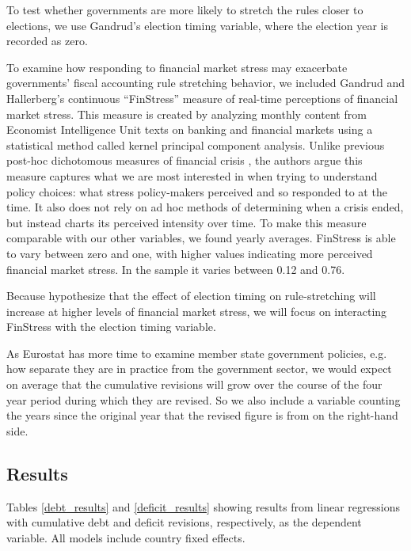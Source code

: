 \documentclass[]{article}
\begin{document}
To test whether governments are more likely to stretch the rules closer to elections, we use Gandrud's \citeyearpar{gandrudYrcurnt} election timing variable, where the election year is recorded as zero.

To examine how responding to financial market stress may exacerbate governments' fiscal accounting rule stretching behavior, we included Gandrud and Hallerberg's \citeyearpar{finstress_paper} continuous ``FinStress'' measure of real-time perceptions of financial market stress. This measure is created by analyzing monthly content from Economist Intelligence Unit texts on banking and financial markets using a statistical method called kernel principal component analysis. Unlike previous post-hoc dichotomous measures of financial crisis \citep[e.g. measures compiled by][]{Laeven2012,ReinhartRog2010}, the authors argue this measure captures what we are most interested in when trying to understand policy choices: what stress policy-makers perceived and so responded to at the time. It also does not rely on ad hoc methods of determining when a crisis ended, but instead charts its perceived intensity over time. To make this measure comparable with our other variables, we found yearly averages. FinStress is able to vary between zero and one, with higher values indicating more perceived financial market stress. In the sample it varies between 0.12 and 0.76.

Because hypothesize that the effect of election timing on rule-stretching will increase at higher levels of financial market stress, we will focus on interacting FinStress with the election timing variable.

As Eurostat has more time to examine member state government policies, e.g. how separate they are in practice from the government sector, we would expect on average that the cumulative revisions will grow over the course of the four year period during which they are revised. So we also include a variable counting the years since the original year that the revised figure is from on the right-hand side.





\subsection{Results}

Tables \ref{debt_results} and \ref{deficit_results} showing results from linear regressions with cumulative debt and deficit revisions, respectively, as the dependent variable. All models include country fixed effects.
\end{document}
